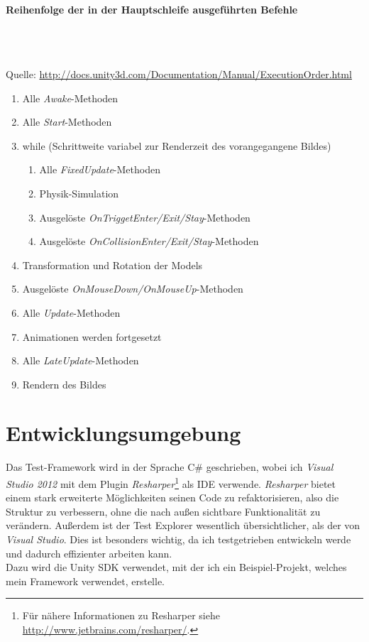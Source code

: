 \paragraph{Reihenfolge der in der Hauptschleife ausgeführten Befehle}\hypertarget{MainLoopOrder}{~}\\
{\small Quelle: \url{http://docs.unity3d.com/Documentation/Manual/ExecutionOrder.html}}
\begin{enumerate}
\item Alle \textit{Awake}-Methoden
\item Alle \textit{Start}-Methoden
\item while (Schrittweite variabel zur Renderzeit des vorangegangene Bildes)
	\begin{enumerate}
	\item[3.1] Alle \textit{FixedUpdate}-Methoden
	\item[3.2] Physik-Simulation
	\item[3.3] Ausgelöste \textit{OnTriggetEnter/Exit/Stay}-Methoden
	\item[3.4] Ausgelöste \textit{OnCollisionEnter/Exit/Stay}-Methoden
	\end{enumerate}
\item Transformation und Rotation der Models
\item Ausgelöste \textit{OnMouseDown/OnMouseUp}-Methoden
\item Alle \textit{Update}-Methoden
\item Animationen werden fortgesetzt
\item Alle \textit{LateUpdate}-Methoden
\item Rendern des Bildes
\end{enumerate}
\clearpage

\section{Entwicklungsumgebung}

Das Test-Framework wird in der Sprache C\# geschrieben, wobei ich \textit{Visual Studio 2012} mit dem Plugin \textit{Resharper}\footnote{Für nähere Informationen zu Resharper siehe \url{http://www.jetbrains.com/resharper/}.} als IDE verwende. \textit{Resharper} bietet einem stark erweiterte Möglichkeiten seinen Code zu refaktorisieren, also die Struktur zu verbessern, ohne die nach außen sichtbare Funktionalität zu verändern. Außerdem ist der Test Explorer wesentlich übersichtlicher, als der von \textit{Visual Studio}. Dies ist besonders wichtig, da ich testgetrieben entwickeln werde und dadurch effizienter arbeiten kann.\\
Dazu wird die Unity SDK verwendet, mit der ich ein Beispiel-Projekt, welches mein Framework verwendet, erstelle.

